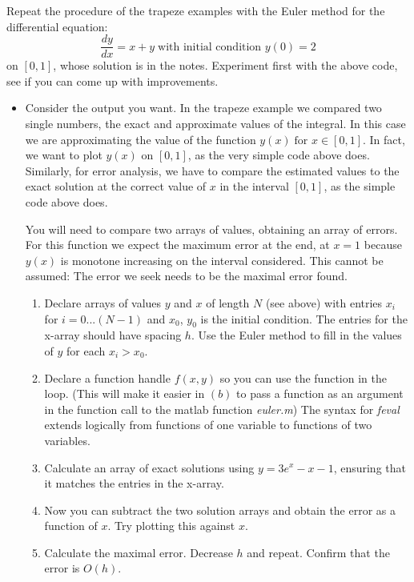 \documentclass[10pt, a4paper]{article}
\begin{document}
Repeat the procedure of the trapeze examples with the Euler method for the differential equation:
$$
    \frac{dy}{dx} = x+y \; \text{with initial condition }y(0) = 2
$$
on $[0,1]$, whose solution is in the notes. Experiment first with the above code, see if you can come up with improvements.  
\begin{itemize}
    \item Consider the output you want. In the trapeze example we compared two single numbers, the
    exact and approximate values of the integral. In this case we are approximating the value of the
    function $y(x) \; \text{for } x\in[0,1]$. In fact, we want to plot $y(x)$ on $[0,1]$, as the very
    simple code above does. Similarly, for error analysis, we have to compare the estimated values to the
    exact solution at the correct value of $x$ in the interval $[0,1]$, as the simple code above
    does.  
    
    You will need to compare two arrays of values, obtaining an array of errors. For this function we
    expect the maximum error at the end, at $x=1$ because $y(x)$ is monotone increasing on the
    interval considered. This cannot be assumed: The error we seek needs to be the maximal error
    found.
    \begin{enumerate}
        \item Declare arrays of values $y$ and $x$ of length $N$ (see above) with entries $x_i$ for
        $i= 0...(N-1)$ and $x_0$, $y_0$ is the initial condition. The entries for the x-array should have
        spacing $h$. Use the Euler method to fill in the values of $y$ for each $x_i>x_0$.

        \item Declare a function handle $f(x,y)$ so you can use the function in the loop. (This will
        make it easier in $(b)$ to pass a function as an argument in the function call to the matlab
        function \textit{euler.m})  The syntax for \textit{feval} extends logically from functions
        of one variable to functions of two variables.

        \item Calculate an array of exact solutions using $y= 3e^x-x-1$, ensuring that it matches
        the entries in the x-array.

        \item Now you can subtract the two solution arrays and obtain the error as a function of
        $x$.  Try plotting this against $x$.  
        
        \item Calculate the maximal error.  Decrease $h$ and repeat. Confirm that the error is $O(h)$.
    \end{enumerate}


\end{itemize}
\end{document}

